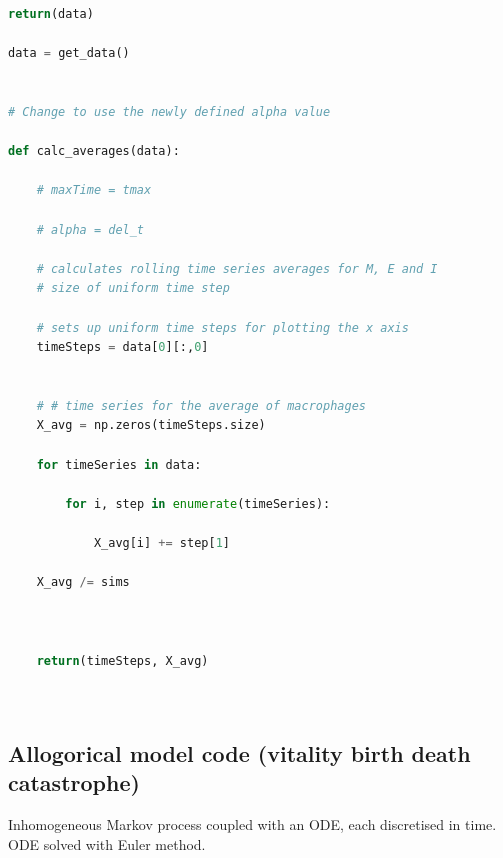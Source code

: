 \begin{lstlisting}[language=Python]
    return(data) 

data = get_data()


# Change to use the newly defined alpha value 

def calc_averages(data): 
    
    # maxTime = tmax
    
    # alpha = del_t

    # calculates rolling time series averages for M, E and I
    # size of uniform time step
    
    # sets up uniform time steps for plotting the x axis
    timeSteps = data[0][:,0]
    
   
    # # time series for the average of macrophages
    X_avg = np.zeros(timeSteps.size)

    for timeSeries in data:
        
        for i, step in enumerate(timeSeries): 
            
            X_avg[i] += step[1]
    
    X_avg /= sims

    
    
    return(timeSteps, X_avg)




\end{lstlisting}













\subsection*{Allogorical model code (vitality birth death catastrophe)}

Inhomogeneous Markov process coupled with an ODE,  each discretised in time.  ODE solved with Euler method.  

